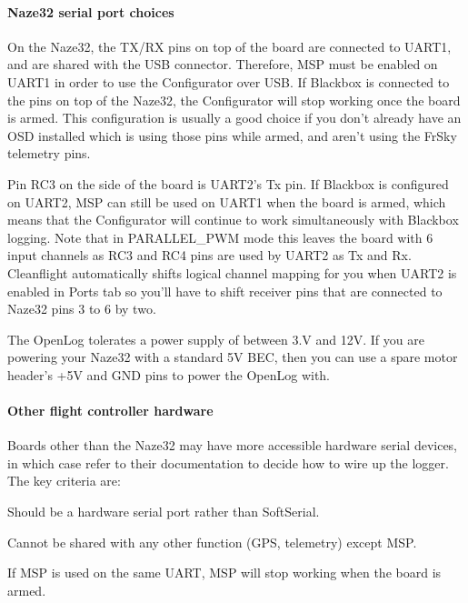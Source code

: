 \paragraph*{Naze32 serial port choices}

On the Naze32, the T\+X/\+R\+X pins on top of the board are connected to U\+A\+R\+T1, and are shared with the U\+S\+B connector. Therefore, M\+S\+P must be enabled on U\+A\+R\+T1 in order to use the Configurator over U\+S\+B. If Blackbox is connected to the pins on top of the Naze32, the Configurator will stop working once the board is armed. This configuration is usually a good choice if you don't already have an O\+S\+D installed which is using those pins while armed, and aren't using the Fr\+Sky telemetry pins.

Pin R\+C3 on the side of the board is U\+A\+R\+T2's Tx pin. If Blackbox is configured on U\+A\+R\+T2, M\+S\+P can still be used on U\+A\+R\+T1 when the board is armed, which means that the Configurator will continue to work simultaneously with Blackbox logging. Note that in {\ttfamily P\+A\+R\+A\+L\+L\+E\+L\+\_\+\+P\+W\+M} mode this leaves the board with 6 input channels as R\+C3 and R\+C4 pins are used by U\+A\+R\+T2 as Tx and Rx. Cleanflight automatically shifts logical channel mapping for you when U\+A\+R\+T2 is enabled in {\ttfamily Ports} tab so you'll have to shift receiver pins that are connected to Naze32 pins 3 to 6 by two.

The Open\+Log tolerates a power supply of between 3.\+V and 12\+V. If you are powering your Naze32 with a standard 5\+V B\+E\+C, then you can use a spare motor header's +5\+V and G\+N\+D pins to power the Open\+Log with.

\paragraph*{Other flight controller hardware}

Boards other than the Naze32 may have more accessible hardware serial devices, in which case refer to their documentation to decide how to wire up the logger. The key criteria are\+:


\begin{DoxyItemize}
\item Should be a hardware serial port rather than Soft\+Serial.
\item Cannot be shared with any other function (G\+P\+S, telemetry) except M\+S\+P.
\item If M\+S\+P is used on the same U\+A\+R\+T, M\+S\+P will stop working when the board is armed.
\end{DoxyItemize}

